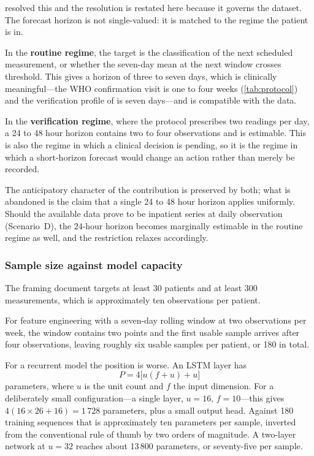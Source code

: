 \documentclass[12pt,a4paper,oneside]{report}
\begin{document}
 resolved this and the resolution is restated here because it governs the dataset. The forecast horizon is not single-valued: it is matched to the regime the patient is in.

In the \textbf{routine regime}, the target is the classification of the next scheduled measurement, or whether the seven-day mean at the next window crosses threshold. This gives a horizon of three to seven days, which is clinically meaningful---the WHO confirmation visit is one to four weeks (\cref{tab:protocol}) and the verification profile of \textcite{mihevc2025} is seven days---and is compatible with the data.

In the \textbf{verification regime}, where the protocol prescribes two readings per day, a 24 to 48 hour horizon contains two to four observations and is estimable. This is also the regime in which a clinical decision is pending, so it is the regime in which a short-horizon forecast would change an action rather than merely be recorded.

The anticipatory character of the contribution is preserved by both; what is abandoned is the claim that a single 24 to 48 hour horizon applies uniformly. Should the available data prove to be inpatient series at daily observation (Scenario~D), the 24-hour horizon becomes marginally estimable in the routine regime as well, and the restriction relaxes accordingly.

\subsubsection{Sample size against model capacity}\label{sec:capacity}

The framing document targets at least 30 patients and at least 300 measurements, which is approximately ten observations per patient.

For feature engineering with a seven-day rolling window at two observations per week, the window contains two points and the first usable sample arrives after four observations, leaving roughly six usable samples per patient, or 180 in total.

For a recurrent model the position is worse. An LSTM layer has
\begin{equation}
  P = 4\bigl[u(f+u) + u\bigr]
\end{equation}
parameters, where $u$ is the unit count and $f$ the input dimension. For a deliberately small configuration---a single layer, $u = 16$, $f = 10$---this gives $4(16 \times 26 + 16) = 1\,728$ parameters, plus a small output head. Against 180 training sequences that is approximately ten parameters per sample, inverted from the conventional rule of thumb by two orders of magnitude. A two-layer network at $u = 32$ reaches about 13\,800 parameters, or seventy-five per sample.
\end{document}
